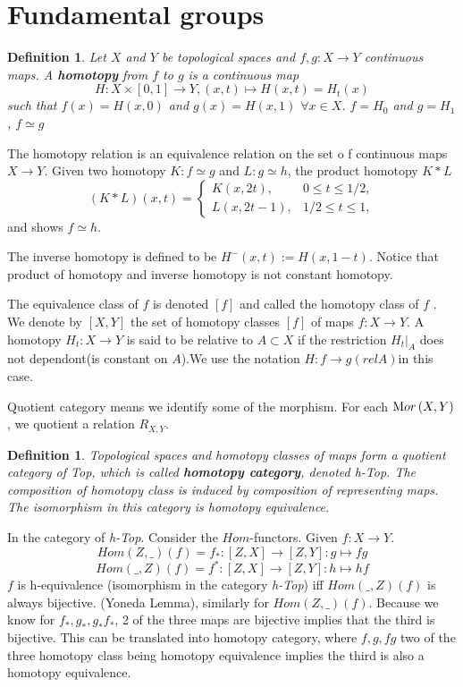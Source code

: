\documentclass[11pt]{article}
\newtheorem{dfn}[thm]{Definition}
\newcommand{\mor}{{\text Mor\,}}
\newcommand{\lrta}{\longrightarrow}
\begin{document}
\section{Fundamental groups}
\begin{dfn}
Let $X$ and $Y$ be topological spaces and $f, g:X\lrta Y$ continuous maps. A \textbf{homotopy} from $f$ to $g$ is a continuous map
$$
H:X\times [0,1]\lrta Y, (x,t)\longmapsto H(x,t)=H_t(x)
$$
such that $f(x)=H(x,0)$ and $g(x)=H(x,1)$ $\forall x\in X$. $f=H_0$ and $g=H_1$, $f\simeq g$
\end{dfn}
The homotopy relation is an equivalence relation on the set o f continuous maps $X\lrta Y$. Given two homotopy $K:f\simeq g$ and $L:g\simeq h$, the product homotopy $K*L$
$$
(K*L)(x,t)=\left\{
\begin{matrix*}
K(x,2t), & 0\leq t\leq 1/2,\\
L(x,2t-1), & 1/2\leq t\leq 1,
\end{matrix*}
\right.
$$
and shows $f\simeq h$.

The inverse homotopy is defined to be $H^{-}(x,t):=H(x,1-t)$. Notice that product of homotopy and inverse homotopy is not constant homotopy.

The equivalence class of $f$ is denoted $[f]$   and called the homotopy class of $f$ . We denote by $[X,Y]$  the set of homotopy classes $[f]$  of maps $f : X \lrta Y$. A homotopy $H_t:  X \lrta  Y$ is said to be relative to $A\subset X$   if the restriction $H_t|_A $ does not dependont(is constant on $A$).We use the notation $H:f \lrta g(rel A)$in this case.

Quotient category means we identify some of the morphism. For each $\mor (X,Y)$, we quotient a  relation $R_{X,Y}$.
\begin{dfn}
Topological spaces and homotopy classes of maps form a quotient category of \textit{Top}, which is called \textbf{homotopy category}, denoted \textit{h-Top}. The composition of homotopy class is induced by composition of representing maps. The isomorphism in this category is homotopy equivalence.
\end{dfn}

In the category of \textit{h-Top}. Consider the $Hom$-functors. Given $f:X\lrta Y$.
$$
Hom(Z,\_)(f)=f_*:[Z,X]\lrta [Z,Y]: g\longmapsto f g
$$
$$
Hom(\_,Z)(f)=f^*:[Z,X]\lrta [Z,Y]: h\longmapsto  hf
$$
$f$ is h-equivalence (isomorphism in the category \textit{h-Top}) iff $Hom(\_,Z)(f)$ is always bijective. (Yoneda Lemma), similarly for $Hom(Z,\_)(f)$. Because we know for $f_*,g_*,g_*f_*$, 2 of the three maps are bijective implies that the third is bijective. This can be translated into homotopy category, where $f,g,fg$ two of the three homotopy class being homotopy equivalence implies the third is also a homotopy equivalence.
\end{document}
